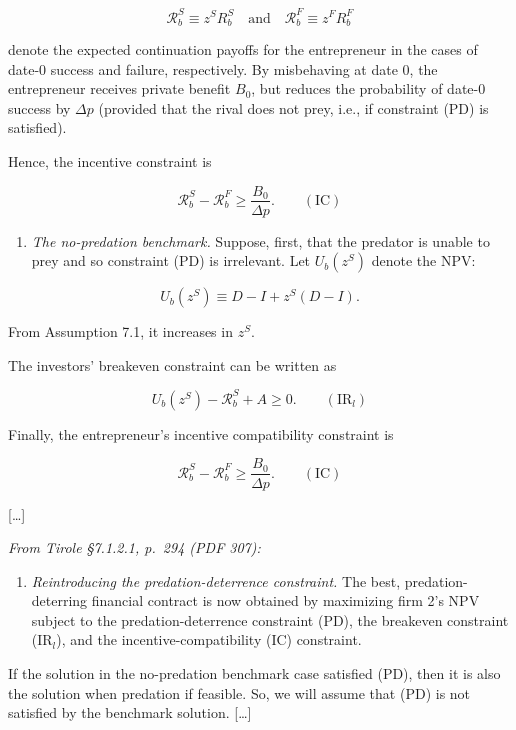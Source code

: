 \documentclass[11pt,a4paper]{article}
\providecommand{\tightlist}{\setlength{\itemsep}{0pt}\setlength{\parskip}{0pt}}
\begin{document}
\[\mathcal{R}_b^S \equiv z^S R_b^S \quad \text{and} \quad \mathcal{R}_b^F \equiv z^F R_b^F\]

denote the expected continuation payoffs for the entrepreneur in the cases of date-0 success and
failure, respectively. By misbehaving at date 0, the entrepreneur receives private benefit \(B_0\),
but reduces the probability of date-0 success by \(\Delta p\) (provided that the rival does not
prey, i.e., if constraint (PD) is satisfied).

Hence, the incentive constraint is

\[\mathcal{R}_b^S - \mathcal{R}_b^F \geqslant \frac{B_0}{\Delta p}. \qquad (\text{IC})\]

\begin{enumerate}
\def\labelenumi{(\alph{enumi})}
\tightlist
\item
  \emph{The no-predation benchmark.} Suppose, first, that the predator is unable to prey and so
  constraint (PD) is irrelevant. Let \(U_b(z^S)\) denote the NPV:
\end{enumerate}

\[U_b(z^S) \equiv D - I + z^S(D - I).\]

From Assumption 7.1, it increases in \(z^S\).

The investors' breakeven constraint can be written as

\[U_b(z^S) - \mathcal{R}_b^S + A \geqslant 0. \qquad (\text{IR}_l)\]

Finally, the entrepreneur's incentive compatibility constraint is

\[\mathcal{R}_b^S - \mathcal{R}_b^F \geqslant \frac{B_0}{\Delta p}. \qquad (\text{IC})\]

{[}\ldots{]}

\emph{From Tirole §7.1.2.1, p.~294 (PDF 307):}

\begin{enumerate}
\def\labelenumi{(\alph{enumi})}
\setcounter{enumi}{1}
\tightlist
\item
  \emph{Reintroducing the predation-deterrence constraint.} The best, predation-deterring financial
  contract is now obtained by maximizing firm 2's NPV subject to the predation-deterrence constraint
  (PD), the breakeven constraint (IR\(_l\)), and the incentive-compatibility (IC) constraint.
\end{enumerate}

If the solution in the no-predation benchmark case satisfied (PD), then it is also the solution when
predation if feasible. So, we will assume that (PD) is not satisfied by the benchmark solution.
{[}\ldots{]}
\end{document}
